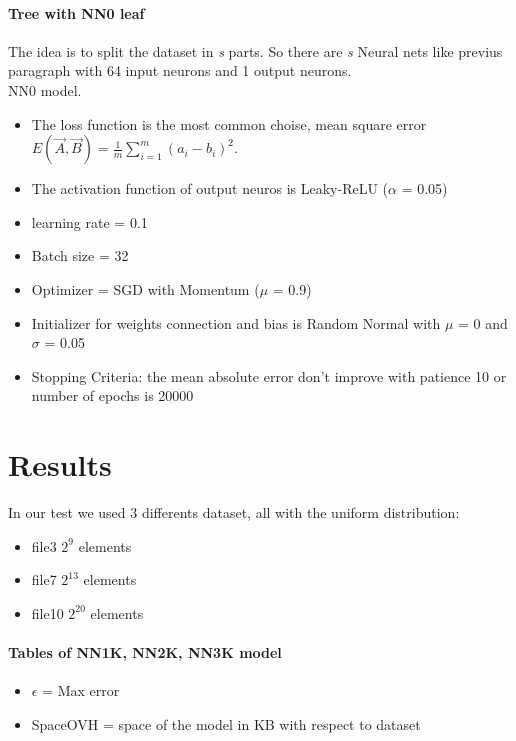 \documentclass[]{article}
\begin{document}
	\paragraph{Tree with NN0 leaf}
	The idea is to split the dataset in \textit{s} parts. So there are \textit{s} Neural nets like previus paragraph with 64 input neurons and 1 output neurons.\\ NN0 model.
	\begin{itemize}
		\item The loss function is the most common choise, mean square error $E(\vec{A}, \vec{B}) = \frac{1}{m} \sum_{i=1}^{m}(a_{i} - b_{i})^{2} $.
		\item The activation function of output neuros is Leaky-ReLU ($\alpha$ = 0.05)
		\item learning rate = 0.1
		\item Batch size = 32
		\item Optimizer = SGD with Momentum ($\mu$ = 0.9)
		\item Initializer for weights connection and bias is Random Normal with $\mu$ = 0 and $\sigma$ = 0.05
		\item Stopping Criteria: the mean absolute error don't improve with patience 10 or number of epochs is 20000
		
	\end{itemize}
	 


	

\section{Results}
	In our test we used 3 differents dataset, all with the uniform distribution: 
	\begin{itemize}
		\item file3 $2^{9}$ elements
		\item file7 $2^{13}$ elements
		\item file10 $2^{20}$ elements
	\end{itemize}

	\paragraph{Tables of NN1K, NN2K, NN3K model}
		\begin{itemize}
			\item $\epsilon$ = Max error
			\item SpaceOVH = space of the model in KB with respect to dataset
		\end{itemize}
	
\end{document}
